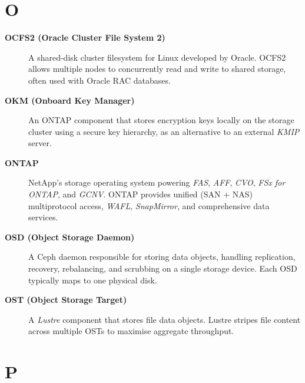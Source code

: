 \section*{O}

\begin{description}

\item[\textbf{OCFS2 (Oracle Cluster File System 2)}]
A shared-disk cluster filesystem for Linux developed by Oracle. OCFS2 allows
multiple nodes to concurrently read and write to shared storage, often used
with Oracle RAC databases.

\item[\textbf{OKM (Onboard Key Manager)}]
An ONTAP component that stores encryption keys locally on the storage
cluster using a secure key hierarchy, as an alternative to an external
\textit{KMIP} server.

\item[\textbf{ONTAP}]
NetApp's storage operating system powering \textit{FAS}, \textit{AFF},
\textit{CVO}, \textit{FSx for ONTAP}, and \textit{GCNV}. ONTAP provides
unified (SAN + NAS) multiprotocol access, \textit{WAFL},
\textit{SnapMirror}, and comprehensive data services.

\item[\textbf{OSD (Object Storage Daemon)}]
A Ceph daemon responsible for storing data objects, handling replication,
recovery, rebalancing, and scrubbing on a single storage device. Each OSD
typically maps to one physical disk.

\item[\textbf{OST (Object Storage Target)}]
A \textit{Lustre} component that stores file data objects. Lustre stripes
file content across multiple OSTs to maximise aggregate throughput.

\end{description}

\section*{P}

